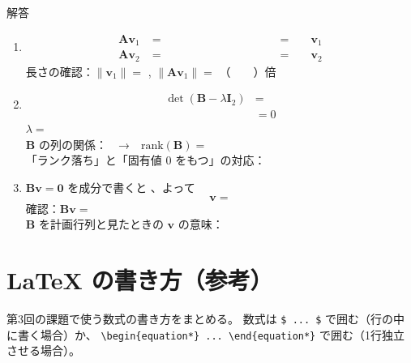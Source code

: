 \documentclass[a4paper,dvipdfmx]{jsarticle}
\newcommand{\提出期限}{2026年10月12日（月）}
\newcommand{\学籍番号}{0000000}
\newcommand{\氏名}{氏名を書く}
\newcommand{\提出日}{2026年10月12日}
\newenvironment{answer}{\begin{itembox}[l]{解答}}{\end{itembox}}
\begin{document}
\begin{enumerate}
\begin{answer}
\begin{enumerate}
          $\lambda_2$ のとき：\phantom{XXXXXXXXXX}、よって $\bm{v}_2 = $ \phantom{XXXXXX}
        \item
          \begin{align*}
            \bm{A}\bm{v}_1 &= \phantom{XXXXXXXXXXXX} = \phantom{XX}\bm{v}_1 \\
            \bm{A}\bm{v}_2 &= \phantom{XXXXXXXXXXXX} = \phantom{XX}\bm{v}_2
          \end{align*}
          長さの確認：$\|\bm{v}_1\| = $ \phantom{XXX}, $\|\bm{A}\bm{v}_1\| = $ \phantom{XXX}
          （　　）倍
        \item
          \begin{align*}
            \det(\bm{B} - \lambda\bm{I}_2) &= \\
                                           &= 0
          \end{align*}
          $\lambda = $ \phantom{XXXXXX} \\[2mm]
          $\bm{B}$ の列の関係：\phantom{XXXXXXXXXXXX}　→　$\mathrm{rank}(\bm{B}) = $ \phantom{XX} \\[2mm]
          「ランク落ち」と「固有値 $0$ をもつ」の対応：
        \item $\bm{B}\bm{v} = \bm{0}$ を成分で書くと \phantom{XXXXXXXXXXXX}、よって
          \begin{equation*}
            \bm{v} =
          \end{equation*}
          確認：$\bm{B}\bm{v} = $ \phantom{XXXXXX} \\[2mm]
          $\bm{B}$ を計画行列と見たときの $\bm{v}$ の意味：
      \end{enumerate}
    \end{answer}

\end{enumerate}

\pagebreak

\section*{LaTeX の書き方（参考）}

第3回の課題で使う数式の書き方をまとめる。
数式は \verb|$ ... $| で囲む（行の中に書く場合）か、
\verb|\begin{equation*} ... \end{equation*}| で囲む（1行独立させる場合）。
\end{document}
